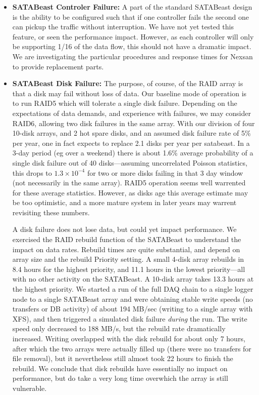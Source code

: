 \begin{itemize}
\item {\bf SATABeast Controler Failure:} A part of the standard SATABeast 
design is the ability to be configured such that if one controller fails the second 
one can pickup the traffic without interruption.
We have not yet tested this feature, or seen the performance impact.
However, as each controller will only be supporting 1/16 of the data flow,
this should not have a dramatic impact.
We are investigating the particular procedures and response times
for Nexsan to provide replacement parts.

\item {\bf SATABeast Disk Failure:} The purpose, of course,
of the RAID array is that a disk may fail without loss of data.
Our baseline  mode of operation is to run RAID5 which will tolerate
a single disk failure.
Depending on the expectations of data demands, and experience with failures,
we may consider RAID6, allowing two disk failures in the same array.
With our division of four 10-disk arrays, and 2 hot spare disks,
and an assumed disk failure rate of 5\% per year, one in fact expects
to replace 2.1 disks per year per satabeast.
In a 3-day period (eg over a weekend) there is about 1.6\% average probability
of a single disk failure out of 40 disks---assuming uncorrelated Poisson statistics,
this drops to $1.3\times 10^{-4}$ for two or more disks failing in that 3 day window
(not necessarily in the same array).
RAID5 operation seems well warrented for these average statistics.
However, as disks age this average estimate may be too optimistic,
and a more mature system in later years may warrent revisiting these numbers.

A disk failure does not lose data, but could yet impact performance.
We exercised the RAID rebuild function of the SATABeast to understand the
impact on data rates.
Rebuild times are quite substantial, and depend on array size and the rebuild 
Priority setting. A small 4-disk array rebuilds in 8.4 hours for the highest
priority, and 11.1 hours in the lowest priority---all with no other activity on the SATABeast.
A 10-disk array takes 13.3 hours at the highest priority.
We started a run of the full DAQ chain to a single logger node 
to a single SATABeast array and were obtaining stable write speeds 
(no transfers or DB activity) 
of about 194 MB/sec (writing to a single array with XFS), 
and then triggered a simulated  disk failure {\it during} the run.
The write speed only decreased to 188 MB/s, but the rebuild rate dramatically increased.
Writing overlapped with the disk rebuild for about only 7 hours, after which
the  two arrays were actually filled up (there were no transfers for file removal),
but it nevertheless still almost took 22 hours to finish the rebuild.
We conclude that disk rebuilds have essentially no impact on performance,
but do take a very long time overwhich the array is still vulnerable.


\end{itemize}
